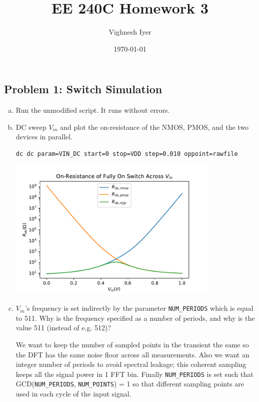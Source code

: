 \documentclass[11pt]{article}
\begin{document}
\title{EE 240C Homework 3}
\author{Vighnesh Iyer}
\date{\today}
\maketitle

\subsection*{Problem 1: Switch Simulation}
\begin{enumerate}[a)]
    \item Run the unmodified script. It runs without errors.

    \item DC sweep $V_{in}$ and plot the on-resistance of the NMOS, PMOS, and the two devices in parallel.

    \begin{verbatim}
dc dc param=VIN_DC start=0 stop=VDD step=0.010 oppoint=rawfile
    \end{verbatim}

    \begin{center}
      \includegraphics[width=0.8\textwidth]{figs/partb.pdf}
    \end{center}

  \item $V_{in}$'s frequency is set indirectly by the parameter \texttt{NUM\_PERIODS} which is equal to 511. Why is the frequency specified as a number of periods, and why is the value 511 (instead of e.g. 512)?

    We want to keep the number of sampled points in the transient the same so the DFT has the same noise floor across all measurements.
    Also we want an integer number of periods to avoid spectral leakage; this coherent sampling keeps all the signal power in 1 FFT bin.
    Finally \texttt{NUM\_PERIODS} is set such that GCD(\texttt{NUM\_PERIODS}, \texttt{NUM\_POINTS}) = 1 so that different sampling points are used in each cycle of the input signal.


\end{enumerate}
\end{document}
